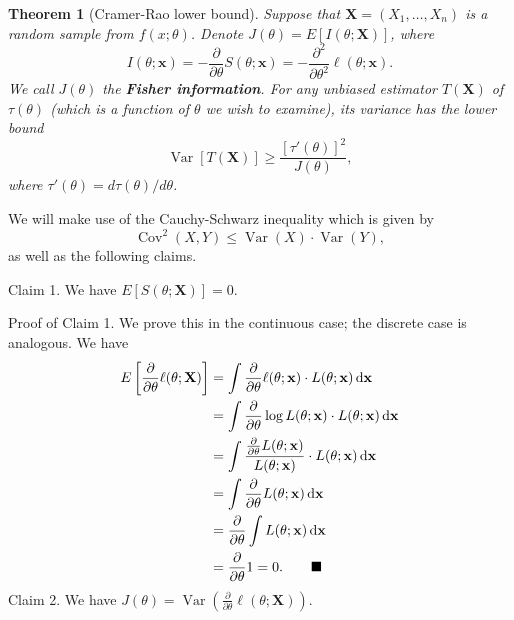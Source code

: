 \documentclass[10pt]{article}
\makeatletter
\newcommand{\dd}{\,{\rm d}}
\DeclareMathOperator{\Var}{Var}
\DeclareMathOperator{\Cov}{Cov}
\theoremstyle{newstyle}
\newtheorem{thm}{Theorem}[section]
\newenvironment{pf}[1][\proofname]{\par
  \pushQED{\qed}%
  \normalfont \topsep0\p@\relax
  \trivlist
  \item[\hskip\labelsep\scshape
  #1\@addpunct{.}]\ignorespaces
}{%
  \popQED\endtrivlist\@endpefalse
}
\makeatother
\begin{document}
\begin{thm}[Cramer-Rao lower bound]
Suppose that $\mathbf{X} = (X_1, \dots, X_n)$ is a random sample from $f(x; \theta)$. 
Denote $J(\theta) = E[I(\theta; \mathbf{X})]$, where 
\[ I(\theta; \mathbf{x}) = -\frac{\partial}{\partial\theta} S(\theta; \mathbf{x}) = 
- \frac{\partial^2}{\partial\theta^2} \ell(\theta; \mathbf{x}). \]
We call $J(\theta)$ the {\bf Fisher information}. For any {\it unbiased} estimator 
$T(\mathbf X)$ of $\tau(\theta)$ (which is a function of $\theta$ we wish to examine), 
its variance has the lower bound 
\[ \Var[T(\mathbf X)] \geq \frac{[\tau'(\theta)]^2}{J(\theta)}, \]
where $\tau'(\theta) = d\tau(\theta)/d\theta$. 
\end{thm}
\begin{pf}
We will make use of the Cauchy-Schwarz inequality which is given by 
\[ \Cov^2(X, Y) \leq \Var(X) \cdot \Var(Y), \]
as well as the following claims. 

{\sc Claim 1.} We have $E[S(\theta; \mathbf{X})] = 0$. 

{\sc Proof of Claim 1.} We prove this in the continuous case; the discrete case is analogous. We have 
\begin{align*}
    E\left[ \frac{\partial}{\partial\theta} \ell(\theta; \mathbf X) \right] 
    &= \int \frac{\partial}{\partial\theta} \ell(\theta; \mathbf x) \cdot L(\theta; \mathbf x)
    \dd \mathbf x \\
    &= \int \frac{\partial}{\partial\theta} \log L(\theta; \mathbf x) \cdot L(\theta; \mathbf x)
    \dd \mathbf x \\
    &= \int \frac{\frac{\partial}{\partial\theta} L(\theta; \mathbf x)}{L(\theta; \mathbf x)} \cdot L(\theta; \mathbf x) \dd \mathbf x \\
    &= \int \frac{\partial}{\partial\theta} L(\theta; \mathbf x) \dd \mathbf x \\
    &= \frac{\partial}{\partial\theta} \int  L(\theta; \mathbf x) \dd \mathbf x \\
    &= \frac{\partial}{\partial\theta} 1 = 0. \tag*{$\blacksquare$}
\end{align*}
{\sc Claim 2.} We have $J(\theta) = \Var(\frac{\partial}{\partial\theta} \ell(\theta; 
\mathbf X))$. 


\end{pf}
\end{document}
